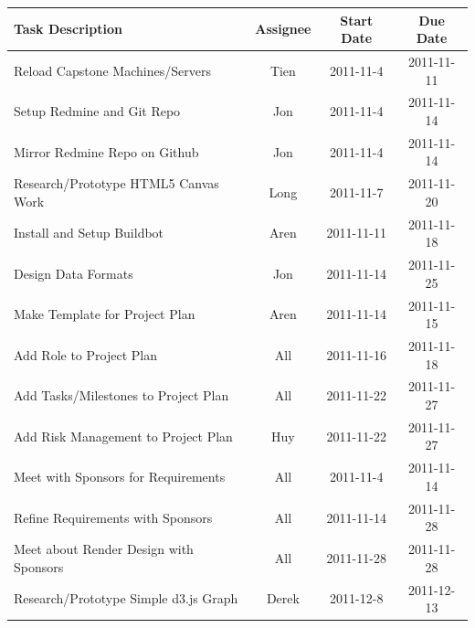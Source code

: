 \documentclass[12pt, letterpaper]{article}
\begin{document}
  \begin{center}
    \begin{tabular}{| p{8.3cm} || c | c | c | }
      \hline
      Task Description & Assignee & Start Date & Due Date \\
      \hline
			Reload Capstone Machines/Servers & Tien & 2011-11-4 & 2011-11-11\\
			Setup Redmine and Git Repo & Jon & 2011-11-4 & 2011-11-14 \\
			Mirror Redmine Repo on Github & Jon & 2011-11-4 & 2011-11-14 \\
			Research/Prototype HTML5 Canvas Work & Long & 2011-11-7 & 2011-11-20 \\
      Install and Setup Buildbot & Aren & 2011-11-11 & 2011-11-18 \\
            Design Data Formats & Jon & 2011-11-14 & 2011-11-25 \\
      Make Template for Project Plan & Aren & 2011-11-14 & 2011-11-15 \\
			Add Role to Project Plan & All & 2011-11-16 & 2011-11-18 \\
			Add Tasks/Milestones to Project Plan & All & 2011-11-22 & 2011-11-27\\
			Add Risk Management to Project Plan & Huy & 2011-11-22 & 2011-11-27\\
			Meet with Sponsors for Requirements & All & 2011-11-4 & 2011-11-14\\
			Refine Requirements with Sponsors & All & 2011-11-14 & 2011-11-28\\
			Meet about Render Design with Sponsors & All & 2011-11-28 & 2011-11-28 \\
            Research/Prototype Simple d3.js Graph & Derek & 2011-12-8 & 2011-12-13 \\
      \hline
    \end{tabular}
  \end{center}
\end{document}

